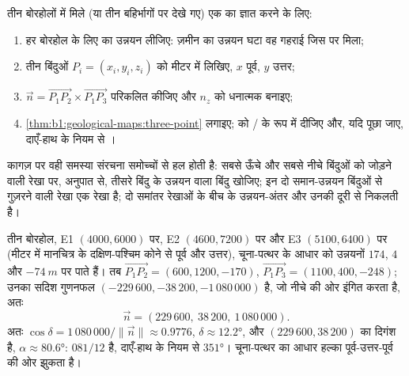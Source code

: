 \begin{method}[तीन-बिंदु समस्या]\label{met:b1:geological-maps:three-point}
तीन बोरहोलों में मिले (या तीन बहिर्भागों पर देखे गए) एक  का  ज्ञात करने के लिए:
\begin{enumerate}
  \item हर बोरहोल के लिए  का उन्नयन लीजिए: ज़मीन का उन्नयन घटा वह गहराई जिस पर  मिला;
  \item तीन बिंदुओं $P_i = (x_i, y_i, z_i)$ को मीटर में लिखिए, $x$ पूर्व, $y$ उत्तर;
  \item $\vec n = \overrightarrow{P_1P_2} \times
        \overrightarrow{P_1P_3}$ परिकलित कीजिए और $n_z$ को धनात्मक बनाइए;
  \item \cref{thm:b1:geological-maps:three-point} लगाइए;  को / के रूप में दीजिए और, यदि पूछा
        जाए, दाएँ-हाथ के नियम से ।
\end{enumerate}
कागज़ पर वही समस्या संरचना समोच्चों से हल होती है: सबसे ऊँचे और सबसे नीचे बिंदुओं को जोड़ने वाली रेखा पर,
अनुपात से, तीसरे बिंदु के उन्नयन वाला बिंदु खोजिए; इन दो समान-उन्नयन बिंदुओं से गुज़रने वाली रेखा एक 
रेखा है;  दो समांतर  रेखाओं के बीच के उन्नयन-अंतर और उनकी दूरी से निकलती है।
\end{method}

\begin{example}[वार्डन अपनति की पूर्वी भुजा]\label{ex:b1:geological-maps:east}
तीन बोरहोल, E1 $(4000, 6000)$ पर, E2 $(4600, 7200)$ पर और E3 $(5100, 6400)$ पर (मीटर में मानचित्र के दक्षिण-पश्चिम
कोने से पूर्व और उत्तर), चूना-पत्थर के आधार को उन्नयनों $174$, $4$ और $\qty{-74}{m}$ पर पाते हैं। तब
$\overrightarrow{P_1P_2} = (600, 1200, -170)$,
$\overrightarrow{P_1P_3} = (1100, 400, -248)$; उनका सदिश गुणनफल
$(-229\,600, -38\,200, -1\,080\,000)$ है, जो नीचे की ओर इंगित करता है, अतः
\[
  \vec n = (229\,600,\ 38\,200,\ 1\,080\,000).
\]
अतः $\cos\delta = 1\,080\,000/\|\vec n\| \approx
0.9776$, $\delta \approx \ang{12.2}$, और  $(229\,600, 38\,200)$ का दिगंश है, $\alpha \approx \ang{80.6}$:
 $081/12$ है, दाएँ-हाथ के नियम से  $\ang{351}$। चूना-पत्थर का आधार हल्का पूर्व-उत्तर-पूर्व
की ओर झुकता है।
\end{example}

